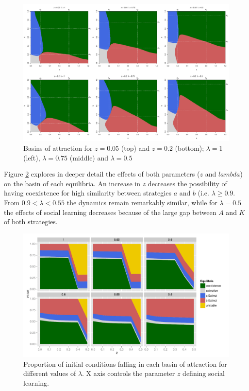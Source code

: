 \documentclass[3p,authoryear,twocolumn]{elsarticle} %
\begin{document}
\begin{figure}
  \centering
      \includegraphics[width=\textwidth]{./figures/figure5}
  \caption{Basins of attraction for $z=0.05$ (top) and $z=0.2$ (bottom); $\lambda=1$ (left), $\lambda=0.75$ (middle) and $\lambda=0.5$}
    \label{fig:overlap}
\end{figure}

Figure \ref{fig:percentages} explores in deeper detail the effects of both parameters ($z$ and $lambda$) on the basin of each equilibria. An increase in $z$ decreases the possibility of having coexistence for high similarity between strategies $a$ and $b$ (i.e. $\lambda \geq 0.9$. From $0.9 < \lambda < 0.55$ the dynamics remain remarkably similar, while for $\lambda = 0.5$ the effects of social learning decreases because of the large gap between $A$ and $K$ of both strategies.



\begin{figure}
  \centering
      \includegraphics[width=\textwidth]{./figures/figure6}
  \caption{Proportion of initial conditions falling in each basin of attraction for different values of $\lambda$. X axis controls the parameter $z$ defining social learning.} %
    \label{fig:percentages}
\end{figure}
\end{document}
